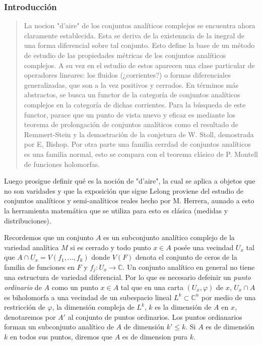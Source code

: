 \documentclass[letterpaper]{article}
\newcommand{\co}{\ensuremath{\mathbb C }}
\newcommand{\con}{\ensuremath{\mathbb{C}^n}}
\begin{document}
\subsubsection{Introducción}
\label{sec:org6eb426f}
\begin{quote}
La nocion "d'aire" de los conjuntos analíticos complejos se encuentra ahora claramente establecida. Esta se deriva de la existenncia de la inegral de una forma diferencial sobre tal conjunto. Esto define la base de un método de estudio de las propiedades métricas de los conjuntos analíticos complejos. A su vez en el estudio de estos aparecen una clase particular de operadores lineares: los fluidos (¿corrientes?) o formas diferenciales generalizadas, que son a la vez positivos y cerrados. En términos más abstractos, se busca un functor de la categoría de conjuntos analíticos complejos en la categoría de dichas corrientes. Para la búsqueda de este functor, parace que un punto de vista nuevo y eficaz es mediante los teorema de prolongación de conjuntos analíticos como el resultado de Remmert-Stein y la demostración de la conjetura de W. Stoll, demostrada por E, Bishop. Por otra parte una familia cerrdad de conjuntos analíticos es una familia normal, esto se compara con el teorema clásico de P. Montell de funciones holomorfas.
\end{quote}

Luego prosigue definir qué es la noción de "d'aire", la cual se aplica a objetos que no son varidades y que la exposición que sigue Lelong proviene del estudio de conjuntos analíticos y semi-analíticos reales hecho por M. Herrera, aunado a esto la herramienta matemática que se utiliza para esto es clásica (medidas y distribuciones).

Recordemos que un conjunto \(A\) es un subconjunto analítico complejo de la variedad analítica \(M\) si es cerrado y todo punto \(x\in A\) posée una vecindad \(U_x\) tal que \(A\cap U_x=V(f_1,\dots,f_k)\) donde \(V(F)\) denota el conjunto de ceros de la familia de funciones en \(F\) y \(f_j:U_x\rightarrow\co\). Un conjunto analítico en general no tiene una estructura de variedad diferencial. Por lo que es necesario defeinir un \emph{punto ordinario} de \(A\) como un punto \(x\in A\) tal que en una carta \((U_x,\varphi)\) de \(x\), \(U_x\cap A\) es biholomorfa a una vecindad de un subespacio lineal \(L^{k}\subset\con\) por medio de una restricción de \(\varphi\), la dimensión compleja de \(L^{k}\), \(k\) es la dimensión de \(A\) en \(x\), denotaremos por \(A'\) al conjunto de puntos ordinarios. Los puntos ordianarios forman un subconjunto analítico de \(A\) de dimensión \(k'\leq k\). Si \(A\) es de dimensión \(k\) en todos sus puntos, diremos que \(A\) es de dimension pura \(k\).
\end{document}
